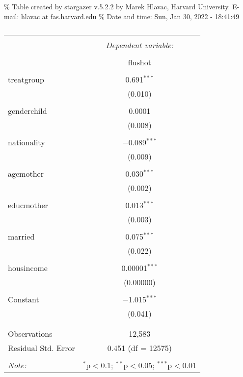 \documentclass[
]{article}
\begin{document}
\% Table created by stargazer v.5.2.2 by Marek Hlavac, Harvard
University. E-mail: hlavac at fas.harvard.edu \% Date and time: Sun, Jan
30, 2022 - 18:41:49

\begin{table}[!htbp] \centering 
  \caption{} 
  \label{} 
\begin{tabular}{@{\extracolsep{5pt}}lc} 
\\[-1.8ex]\hline 
\hline \\[-1.8ex] 
 & \multicolumn{1}{c}{\textit{Dependent variable:}} \\ 
\cline{2-2} 
\\[-1.8ex] & flushot \\ 
\hline \\[-1.8ex] 
 treatgroup & 0.691$^{***}$ \\ 
  & (0.010) \\ 
  & \\ 
 genderchild & 0.0001 \\ 
  & (0.008) \\ 
  & \\ 
 nationality & $-$0.089$^{***}$ \\ 
  & (0.009) \\ 
  & \\ 
 agemother & 0.030$^{***}$ \\ 
  & (0.002) \\ 
  & \\ 
 educmother & 0.013$^{***}$ \\ 
  & (0.003) \\ 
  & \\ 
 married & 0.075$^{***}$ \\ 
  & (0.022) \\ 
  & \\ 
 housincome & 0.00001$^{***}$ \\ 
  & (0.00000) \\ 
  & \\ 
 Constant & $-$1.015$^{***}$ \\ 
  & (0.041) \\ 
  & \\ 
\hline \\[-1.8ex] 
Observations & 12,583 \\ 
Residual Std. Error & 0.451 (df = 12575) \\ 
\hline 
\hline \\[-1.8ex] 
\textit{Note:}  & \multicolumn{1}{r}{$^{*}$p$<$0.1; $^{**}$p$<$0.05; $^{***}$p$<$0.01} \\ 
\end{tabular} 
\end{table}
\end{document}
